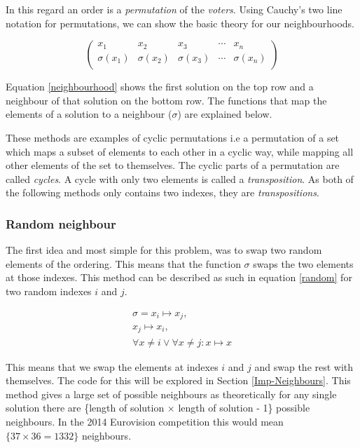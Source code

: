 \documentclass[12pt]{report}
\begin{document}
In this regard an order is a \textit{permutation} of the \textit{voters}. Using Cauchy's two line notation for permutations\cite{Cauchy}, we can show the basic theory for our neighbourhoods.

\begin{equation}\label{neighbourhood}
\begin{pmatrix}
x_{1} & x_{2} & x_{3} & \cdots & x_{n} \\
\sigma(x_{1}) & \sigma(x_{2}) & \sigma(x_{3}) & \cdots & \sigma(x_{n}) \\
\end{pmatrix}
\end{equation}

Equation \ref{neighbourhood} shows the first solution on the top row and a neighbour of that solution on the bottom row. The functions that map the elements of a solution to a neighbour ($\sigma$) are explained below.

These methods are examples of cyclic permutations i.e a permutation of a set which maps a subset of elements to each other in a cyclic way, while mapping all other elements of the set to themselves. The cyclic parts of a permutation are called \textit{cycles}. A cycle with only two elements is called a \textit{transposition}\cite{cyclicPerm}. As both of the following methods only contains two indexes, they are \textit{transpositions}.

\subsubsection{Random neighbour}
The first idea and most simple for this problem, was to swap two random elements of the ordering. This means that the function $\sigma$ swaps the two elements at those indexes. This method can be described as such in equation \ref{random} for two random indexes $i$ and $j$.

\begin{equation}\label{random}
\begin{split}
	\sigma = x_i \mapsto x_j,\\ x_j \mapsto x_i,\\ \forall x \neq i \lor \forall x \neq j: x \mapsto x
\end{split}
\end{equation}

This means that we swap the elements at indexes $i$ and $j$ and swap the rest with themselves. The code for this will be explored in Section \ref{Imp-Neighbours}. This method gives a large set of possible neighbours as theoretically for any single solution there are \{length of solution $\times$ length of solution - 1\} possible neighbours. In the 2014 Eurovision competition this would mean $\{37 \times 36 = 1332\}$ neighbours.
\end{document}
